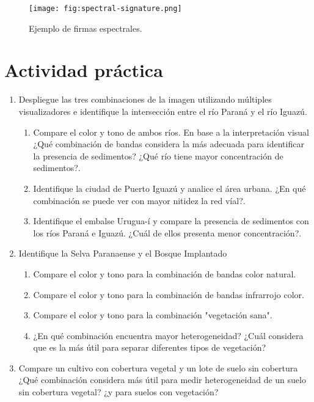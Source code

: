 \begin{figure}[h!]
    \centering
    \texttt{[image: fig:spectral-signature.png]}
    \caption{Ejemplo de firmas espectrales.}
    \label{fig:spectral-signature}
\end{figure}

\section{Actividad práctica}
\begin{enumerate}
  \item Despliegue las tres combinaciones de la imagen utilizando múltiples visualizadores e identifique la intersección entre el río Paraná y el río Iguazú.
  \begin{enumerate}
  \item Compare el color y tono de ambos ríos. En base a la interpretación visual ¿Qué combinación de bandas considera la más adecuada para identificar la presencia de sedimentos? ¿Qué río tiene mayor concentración de sedimentos?.

  \item  Identifique la ciudad de Puerto Iguazú y analice el área urbana. ¿En qué combinación se puede ver con mayor nitidez la red víal?.

  \item  Identifique el embalse Urugua-í y compare la presencia de sedimentos con los ríos Paraná e Iguazú. ¿Cuál de ellos presenta menor concentración?.
\end{enumerate}

  \item Identifique la Selva Paranaense y el Bosque Implantado
  \begin{enumerate}
    \item  Compare el color y tono para la combinación de bandas color natural.
    \item  Compare el color y tono para la combinación de bandas infrarrojo color.
    \item  Compare el color y tono para la combinación "vegetación sana".
    \item  ¿En qué combinación encuentra mayor heterogeneidad? ¿Cuál considera que es la más útil para separar diferentes tipos de vegetación?
  \end{enumerate}

  \item Compare un cultivo con cobertura vegetal y un lote de suelo sin cobertura  ¿Qué combinación considera más útil para medir heterogeneidad de un suelo sin cobertura vegetal? ¿y para suelos con vegetación?



\end{enumerate}
